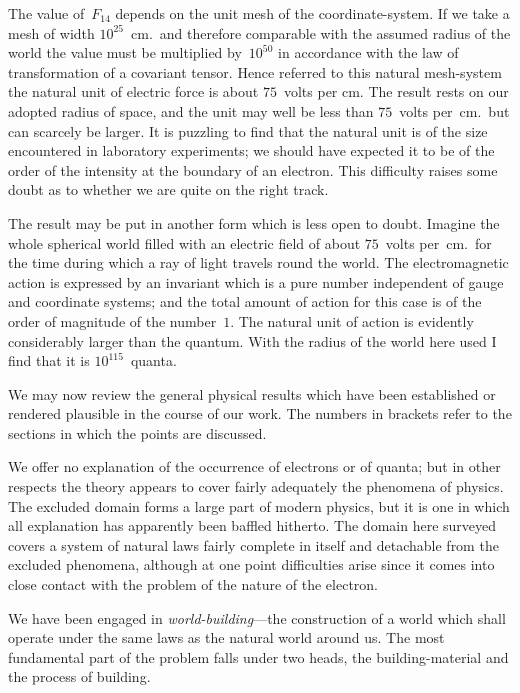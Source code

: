 \documentclass[12pt]{book}
\begin{document}
The value of~$F_{14}$ depends on the unit mesh of the coordinate-system. If
we take a mesh of width $10^{25}$~cm.\ and therefore comparable with the assumed
radius of the world the value must be multiplied by~$10^{50}$ in accordance with
the law of transformation of a covariant tensor. Hence referred to this natural
mesh-system the natural unit of electric force is about $75$~volts per cm. The
result rests on our adopted radius of space, and the unit may well be less than
$75$~volts per~cm.\ but can scarcely be larger. It is puzzling to find that the
natural unit is of the size encountered in laboratory experiments; we should
%
have expected it to be of the order of the intensity at the boundary of an
electron. This difficulty raises some doubt as to whether we are quite on the
right track.

The result may be put in another form which is less open to doubt.
Imagine the whole spherical world filled with an electric field of about $75$~volts
per~cm.\ for the time during which a ray of light travels round the world. The
electromagnetic action is expressed by an invariant which is a pure number
%
independent of gauge and coordinate systems; and the total amount of action
for this case is of the order of magnitude of the number~$1$. The natural unit
of action is evidently considerably larger than the quantum. With the radius
%
%
of the world here used I find that it is $10^{115}$~quanta.


We may now review the general physical results which have been established
or rendered plausible in the course of our work. The numbers in brackets
refer to the sections in which the points are discussed.

We offer no explanation of the occurrence of electrons or of quanta; but
in other respects the theory appears to cover fairly adequately the phenomena
of physics. The excluded domain forms a large part of modern physics, but it
is one in which all explanation has apparently been baffled hitherto. The
domain here surveyed covers a system of natural laws fairly complete in itself
and detachable from the excluded phenomena, although at one point difficulties
arise since it comes into close contact with the problem of the nature of the
electron.

We have been engaged in \emph{world-building}---the construction of a world
which shall operate under the same laws as the natural world around us. The
most fundamental part of the problem falls under two heads, the building-material
and the process of building.
\end{document}
